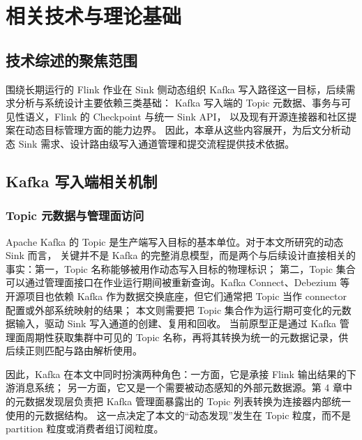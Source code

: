
\chapter{相关技术与理论基础}

\section{技术综述的聚焦范围}

围绕长期运行的 Flink 作业在 Sink 侧动态组织 Kafka 写入路径这一目标，后续需求分析与系统设计主要依赖三类基础：
Kafka 写入端的 Topic 元数据、事务与可见性语义，Flink 的 Checkpoint 与统一 Sink API，
以及现有开源连接器和社区提案在动态目标管理方面的能力边界。
因此，本章从这些内容展开，为后文分析动态 Sink 需求、设计路由级写入通道管理和提交流程提供技术依据。

\section{Kafka 写入端相关机制}

\subsection{Topic 元数据与管理面访问}

Apache Kafka 的 Topic 是生产端写入目标的基本单位\cite{kreps2011kafka}。对于本文所研究的动态 Sink 而言，
关键并不是 Kafka 的完整消息模型，而是两个与后续设计直接相关的事实：第一，Topic 名称能够被用作动态写入目标的物理标识；
第二，Topic 集合可以通过管理面接口在作业运行期间被重新查询。Kafka Connect、Debezium 等开源项目也依赖 Kafka
作为数据交换底座，但它们通常把 Topic 当作 connector 配置或外部系统映射的结果\cite{kafkaConnectDocs,debeziumDocs}；
本文则需要把 Topic 集合作为运行期可变化的元数据输入，驱动 Sink 写入通道的创建、复用和回收。
当前原型正是通过 Kafka 管理面周期性获取集群中可见的 Topic 名称，再将其转换为统一的元数据记录，供后续正则匹配与路由解析使用。

因此，Kafka 在本文中同时扮演两种角色：一方面，它是承接 Flink 输出结果的下游消息系统；
另一方面，它又是一个需要被动态感知的外部元数据源。第 4 章中的元数据发现层负责把 Kafka 管理面暴露出的 Topic 列表转换为连接器内部统一使用的元数据结构。
这一点决定了本文的“动态发现”发生在 Topic 粒度，而不是 partition 粒度或消费者组订阅粒度。

